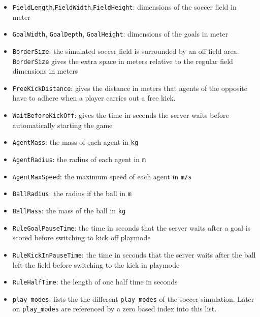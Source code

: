 \begin{itemize}
  
\item \texttt{FieldLength},\texttt{FieldWidth},\texttt{FieldHeight}:
  dimensions of the soccer field in meter
  
\item \texttt{GoalWidth}, \texttt{GoalDepth}, \texttt{GoalHeight}:
  dimensions of the goals in meter
  
\item \texttt{BorderSize}: the simulated soccer field is surrounded by
  an off field area. \texttt{BorderSize} gives the extra space in
  meters relative to the regular field dimensions in meters
  
\item \texttt{FreeKickDistance}: gives the distance in meters that
  agents of the opposite have to adhere when a player carries out a
  free kick.
  
\item \texttt{WaitBeforeKickOff}: gives the time in seconds the server
  waits before automatically starting the game

\item \texttt{AgentMass}: the mass of each agent in \texttt{kg}

\item \texttt{AgentRadius}: the radius of each agent in \texttt{m}
  
\item \texttt{AgentMaxSpeed}: the maximum speed of each agent in
  \texttt{m/s}

\item \texttt{BallRadius}: the radius if the ball in \texttt{m}
  
\item \texttt{BallMass}: the mass of the ball in \texttt{kg}
  
\item \texttt{RuleGoalPauseTime}: the time in seconds that the server
  waits after a goal is scored before switching to kick off playmode
  
\item \texttt{RuleKickInPauseTime}: the time in seconds that the
  server waits after the ball left the field before switching to the
  kick in playmode

\item \texttt{RuleHalfTime}: the length of one half time in seconds
  
\item \texttt{play\_modes}: lists the the different
  \texttt{play\_modes} of the soccer simulation. Later on
  \texttt{play\_modes} are referenced by a zero based index into this
  list.

\end{itemize}


